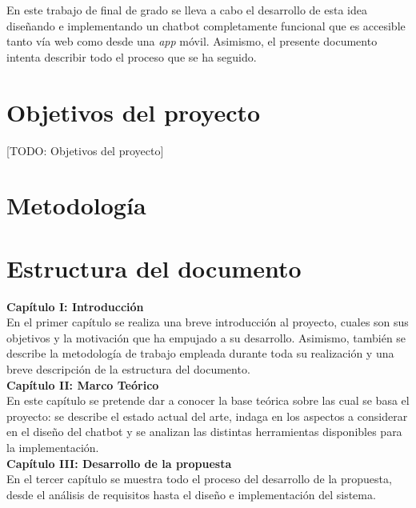 En este trabajo de final de grado se lleva a cabo el desarrollo de esta idea diseñando e implementando un chatbot completamente funcional que es accesible tanto vía web como desde una \textit{app} móvil. Asimismo, el presente documento intenta describir todo el proceso que se ha seguido.



\section{Objetivos del proyecto}
[TODO: Objetivos del proyecto]

\section{Metodología}


\section{Estructura del documento}
\noindent \textbf{Capítulo I: Introducción}\\
En el primer capítulo se realiza una breve introducción al proyecto, cuales son sus objetivos y la motivación que ha empujado a su desarrollo. Asimismo, también se describe la metodología de trabajo empleada durante toda su realización y una breve descripción de la estructura del documento.  \\

\noindent \textbf{Capítulo II: Marco Teórico}\\
En este capítulo se pretende dar a conocer la base teórica sobre las cual se basa el proyecto: se describe el estado actual del arte, indaga en los aspectos a considerar en el diseño del chatbot y se analizan las distintas herramientas disponibles para la implementación.\\

\noindent \textbf{Capítulo III: Desarrollo de la propuesta}\\
En el tercer capítulo se muestra todo el proceso del desarrollo de la propuesta, desde el análisis de requisitos hasta el diseño e implementación del sistema. \\

